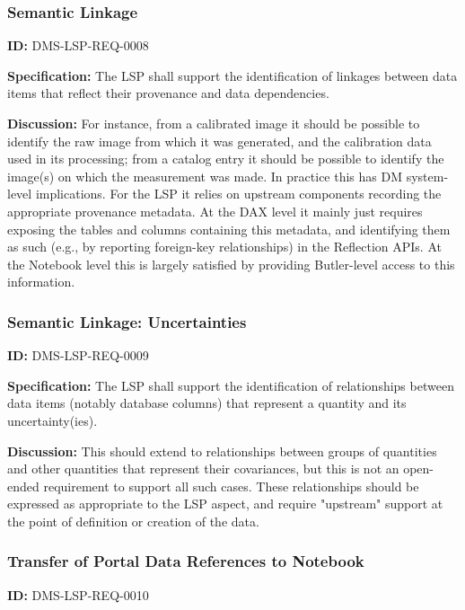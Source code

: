 \documentclass[SE,toc,lsstdraft]{lsstdoc}
\begin{document}
\subsubsection{Semantic Linkage}

\label{DMS-LSP-REQ-0008}
\textbf{ID:} DMS-LSP-REQ-0008

\textbf{Specification:}
The LSP shall support the identification of linkages between data items that reflect their provenance and data dependencies.

\textbf{Discussion:}
For instance, from a calibrated image it should be possible to identify the raw image from which it was generated, and the calibration data used in its processing; from a catalog entry it should be possible to identify the image(s) on which the measurement was made.
In practice this has DM system-level implications.  For the LSP it relies on upstream components recording the appropriate provenance metadata.  At the DAX level it mainly just requires exposing the tables and columns containing this metadata, and identifying them as such (e.g., by reporting foreign-key relationships) in the Reflection APIs.  At the Notebook level this is largely satisfied by providing Butler-level access to this information.

\subsubsection{Semantic Linkage: Uncertainties}

\label{DMS-LSP-REQ-0009}
\textbf{ID:} DMS-LSP-REQ-0009

\textbf{Specification:}
The LSP shall support the identification of relationships between data items (notably database columns) that represent a quantity and its uncertainty(ies).

\textbf{Discussion:}
This should extend to relationships between groups of quantities and other quantities that represent their covariances, but this is not an open-ended requirement to support all such cases.
These relationships should be expressed as appropriate to the LSP aspect, and require "upstream" support at the point of definition or creation of the data.

\subsubsection{Transfer of Portal Data References to Notebook}

\label{DMS-LSP-REQ-0010}
\textbf{ID:} DMS-LSP-REQ-0010
\end{document}
